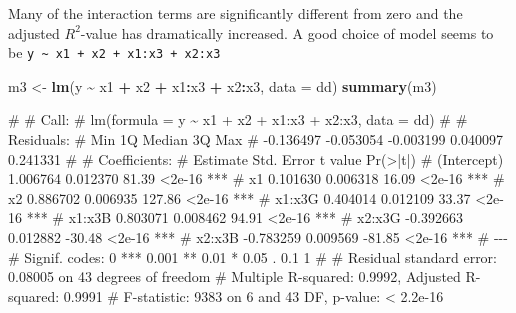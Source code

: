 \documentclass[
  a4paper,
]{article}
\newenvironment{Shaded}{\begin{snugshade}}{\end{snugshade}}
\newcommand{\AttributeTok}[1]{\textcolor[rgb]{0.13,0.29,0.53}{#1}}
\newcommand{\FunctionTok}[1]{\textcolor[rgb]{0.13,0.29,0.53}{\textbf{#1}}}
\newcommand{\NormalTok}[1]{#1}
\newcommand{\OtherTok}[1]{\textcolor[rgb]{0.56,0.35,0.01}{#1}}
\newcommand{\SpecialCharTok}[1]{\textcolor[rgb]{0.81,0.36,0.00}{\textbf{#1}}}
\theoremstyle{definition}
\theoremstyle{definition}
\theoremstyle{definition}
\theoremstyle{definition}
\theoremstyle{remark}
\begin{document}
\begin{myanswers}
Many of the interaction terms are significantly
different from zero and the adjusted \(R^2\)-value has
dramatically increased. A good choice of model seems
to be \texttt{y\ \textasciitilde{}\ x1\ +\ x2\ +\ x1:x3\ +\ x2:x3}

\begin{Shaded}
\begin{Highlighting}[]
\NormalTok{m3 }\OtherTok{\textless{}{-}} \FunctionTok{lm}\NormalTok{(y }\SpecialCharTok{\textasciitilde{}}\NormalTok{ x1 }\SpecialCharTok{+}\NormalTok{ x2 }\SpecialCharTok{+}\NormalTok{ x1}\SpecialCharTok{:}\NormalTok{x3 }\SpecialCharTok{+}\NormalTok{ x2}\SpecialCharTok{:}\NormalTok{x3, }\AttributeTok{data =}\NormalTok{ dd)}
\FunctionTok{summary}\NormalTok{(m3)}
\end{Highlighting}
\end{Shaded}

\begin{Shaded}
\begin{Highlighting}[]
\NormalTok{\# }
\NormalTok{\# Call:}
\NormalTok{\# lm(formula = y \textasciitilde{} x1 + x2 + x1:x3 + x2:x3, data = dd)}
\NormalTok{\# }
\NormalTok{\# Residuals:}
\NormalTok{\#       Min        1Q    Median        3Q       Max }
\NormalTok{\# {-}0.136497 {-}0.053054 {-}0.003199  0.040097  0.241331 }
\NormalTok{\# }
\NormalTok{\# Coefficients:}
\NormalTok{\#              Estimate Std. Error t value Pr(\textgreater{}|t|)    }
\NormalTok{\# (Intercept)  1.006764   0.012370   81.39   \textless{}2e{-}16 ***}
\NormalTok{\# x1           0.101630   0.006318   16.09   \textless{}2e{-}16 ***}
\NormalTok{\# x2           0.886702   0.006935  127.86   \textless{}2e{-}16 ***}
\NormalTok{\# x1:x3G       0.404014   0.012109   33.37   \textless{}2e{-}16 ***}
\NormalTok{\# x1:x3B       0.803071   0.008462   94.91   \textless{}2e{-}16 ***}
\NormalTok{\# x2:x3G      {-}0.392663   0.012882  {-}30.48   \textless{}2e{-}16 ***}
\NormalTok{\# x2:x3B      {-}0.783259   0.009569  {-}81.85   \textless{}2e{-}16 ***}
\NormalTok{\# {-}{-}{-}}
\NormalTok{\# Signif. codes:  0 \textquotesingle{}***\textquotesingle{} 0.001 \textquotesingle{}**\textquotesingle{} 0.01 \textquotesingle{}*\textquotesingle{} 0.05 \textquotesingle{}.\textquotesingle{} 0.1 \textquotesingle{} \textquotesingle{} 1}
\NormalTok{\# }
\NormalTok{\# Residual standard error: 0.08005 on 43 degrees of freedom}
\NormalTok{\# Multiple R{-}squared:  0.9992,  Adjusted R{-}squared:  0.9991 }
\NormalTok{\# F{-}statistic:  9383 on 6 and 43 DF,  p{-}value: \textless{} 2.2e{-}16}
\end{Highlighting}
\end{Shaded}


\end{myanswers}
\end{document}
